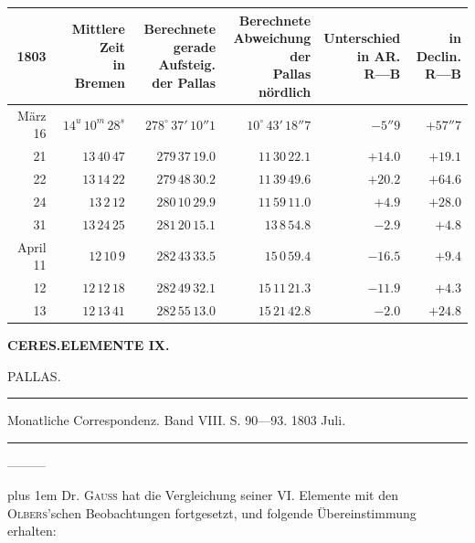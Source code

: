 \begin{center}
\begingroup\fontsize{8}{10}\selectfont\setlength{\tabcolsep}{3pt}\renewcommand{\arraystretch}{1.12}
\begin{tabular}{r|r|r|r|r|r}
1803 & \shortstack{Mittlere Zeit\\in\\Bremen} & \shortstack{Berechnete\\gerade Aufsteig.\\der Pallas} & \shortstack{Berechnete\\Abweichung der\\Pallas nördlich} & \shortstack{Unterschied\\in AR.\\R—B} & \shortstack{in Declin.\\R—B} \\ \hline
März 16 & $14^u\,10^m\,28^s$ & $278^\circ\,37'\,10''1$ & $10^\circ\,43'\,18''7$ & $-5''9$ & $+57''7$ \\
21 & $13\,40\,47$ & $279\,37\,19.0$ & $11\,30\,22.1$ & $+14.0$ & $+19.1$ \\
22 & $13\,14\,22$ & $279\,48\,30.2$ & $11\,39\,49.6$ & $+20.2$ & $+64.6$ \\
24 & $13\,2\,12$ & $280\,10\,29.9$ & $11\,59\,11.0$ & $+4.9$ & $+28.0$ \\
31 & $13\,24\,25$ & $281\,20\,15.1$ & $13\,8\,54.8$ & $-2.9$ & $+4.8$ \\
April 11 & $12\,10\,9$ & $282\,43\,33.5$ & $15\,0\,59.4$ & $-16.5$ & $+9.4$ \\
12 & $12\,12\,18$ & $282\,49\,32.1$ & $15\,11\,21.3$ & $-11.9$ & $+4.3$ \\
13 & $12\,13\,41$ & $282\,55\,13.0$ & $15\,21\,42.8$ & $-2.0$ & $+24.8$ \\
\end{tabular}\endgroup
\end{center}

\begin{flushright}
\end{flushright}
\clearpage
\thispagestyle{empty}
\noindent{}%
\makebox[12mm][l]{}%
\parbox[t]{\dimexpr\linewidth-24mm\relax}{\centering\footnotesize\bfseries CERES.\quad ELEMENTE IX.\par}%
\par\nobreak\medskip
\begin{center}\large PALLAS.\end{center}
\begin{center}\parbox{.86\linewidth}{\centering\footnotesize\frenchspacing
\hrule height .3pt\relax\vspace{2.5pt}
Monatliche Correspondenz. Band VIII. S. 90—93. 1803 Juli.\par
\vspace{2.5pt}\hrule height .3pt\relax
}\end{center}
\par\indent ---\enspace---\enspace---\par\nobreak
{\rightskip=0pt plus 1em
Dr. \textsc{Gauss} hat die Vergleichung seiner VI. Elemente mit den \textsc{Olbers}'schen Beobachtungen fortgesetzt, und folgende Übereinstimmung erhalten:\par}


